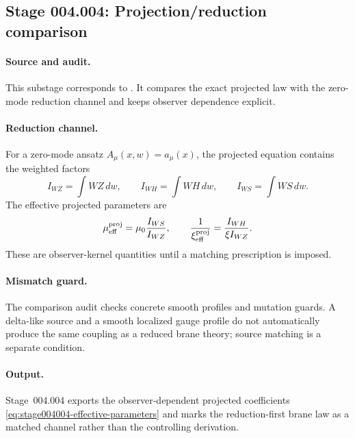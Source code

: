 \subsection*{Stage 004.004: Projection/reduction comparison}
\label{subsec:stage004004-projection-reduction-comparison}

\paragraph{Source and audit.}
This substage corresponds to
.
It compares the exact projected law with the zero-mode reduction channel and
keeps observer dependence explicit.

\paragraph{Reduction channel.}
For a zero-mode ansatz \(A_\mu(x,w)=a_\mu(x)\), the projected equation contains
the weighted factors
\begin{equation}
\label{eq:stage004004-projected-integrals}
I_{WZ}=\int WZ\,dw,\qquad
I_{WH}=\int WH\,dw,\qquad
I_{WS}=\int WS\,dw .
\end{equation}
The effective projected parameters are
\begin{equation}
\label{eq:stage004004-effective-parameters}
\mu_{\rm eff}^{\rm proj}=\mu_0\frac{I_{WS}}{I_{WZ}},
\qquad
\frac1{\xi_{\rm eff}^{\rm proj}}=\frac{I_{WH}}{\xi I_{WZ}}.
\end{equation}
These are observer-kernel quantities until a matching prescription is imposed.

\paragraph{Mismatch guard.}
The comparison audit checks concrete smooth profiles and mutation guards.  A
delta-like source and a smooth localized gauge profile do not automatically
produce the same coupling as a reduced brane theory; source matching is a
separate condition.

\paragraph{Output.}
Stage~004.004 exports the observer-dependent projected coefficients
\eqref{eq:stage004004-effective-parameters} and marks the reduction-first
brane law as a matched channel rather than the controlling derivation.
